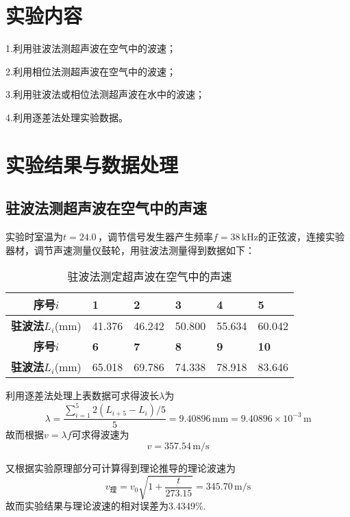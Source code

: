 \documentclass[UTF-8,twoside,cs4size]{ctexart}
\begin{document}
	\section{实验内容}
	1.利用驻波法测超声波在空气中的波速；
	
	2.利用相位法测超声波在空气中的波速；
	
	3.利用驻波法或相位法测超声波在水中的波速；
		
	4.利用逐差法处理实验数据。
	
	\section{实验结果与数据处理}
	\subsection{驻波法测超声波在空气中的声速}
	实验时室温为$ t=24.0 $\,\textcelsius，调节信号发生器产生频率$ f=38\,\mathrm{kHz} $的正弦波，连接实验器材，调节声速测量仪鼓轮，用驻波法测量得到数据如下：
	\begin{table}[!h]
		\centering
		\renewcommand\arraystretch{1.4}
		\captionsetup{skip=0pt}
		\caption{驻波法测定超声波在空气中的声速}
		\begin{tabularx}{\textwidth}{|c|Y|Y|Y|Y|Y|}
			\hline
			\textbf{序号}$ i $&\textbf{1}&\textbf{2}&\textbf{3}&\textbf{4}&\textbf{5}\\
			\hline
			\textbf{驻波法}$ L_i $(mm)&41.376&46.242&50.800&55.634&60.042\\
			\hline
			\textbf{序号}$ i $&\textbf{6}&\textbf{7}&\textbf{8}&\textbf{9}&\textbf{10}\\
			\hline
			\textbf{驻波法}$ L_i $(mm)&65.018&69.786&74.338&78.918&83.646\\
			\hline
		\end{tabularx}
	\end{table}
	
	利用逐差法处理上表数据可求得波长$ \lambda $为
	\[\lambda=\frac{\sum_{i=1}^{5}2(L_{i+5}-L_i)/5}{5}=9.40896\,\mathrm{mm}=9.40896\times10^{-3}\,\mathrm{m}\]
	故而根据$ v=\lambda f $可求得波速为
	\[v=357.54\,\mathrm{m/s}\]
	
	又根据实验原理部分可计算得到理论推导的理论波速为
	\[v_{\text{理}}=v_0\sqrt{1+\frac{t}{273.15}}=345.70\,\mathrm{m/s}\]
	故而实验结果与理论波速的相对误差为3.4349\%.
	
\end{document}
